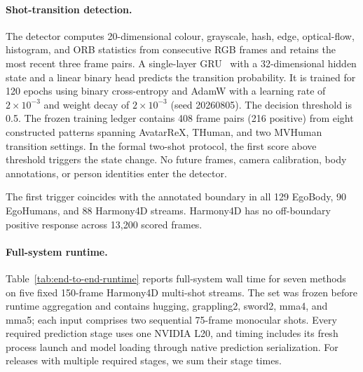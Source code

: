 \paragraph{Shot-transition detection.}
The detector computes 20-dimensional colour, grayscale, hash, edge, optical-flow,
histogram, and ORB statistics from consecutive RGB frames and retains the most
recent three frame pairs. A single-layer GRU~\citep{cho2014gru} with a
32-dimensional hidden state and a linear binary head predicts the transition
probability. It is trained for 120 epochs using binary cross-entropy and AdamW
with a learning rate of $2\!\times\!10^{-3}$ and weight decay of
$2\!\times\!10^{-3}$ (seed 20260805). The decision threshold is 0.5. The
frozen training ledger contains 408 frame pairs (216
positive) from eight constructed patterns spanning AvatarReX, THuman, and two
MVHuman transition settings. In the formal two-shot protocol, the first score
above threshold triggers the state change. No future frames, camera calibration,
body annotations, or person identities enter the detector.

The first trigger coincides with the annotated boundary in all 129 EgoBody,
90 EgoHumans, and 88 Harmony4D streams. Harmony4D has no off-boundary positive
response across 13,200 scored frames.

\paragraph{Full-system runtime.}
Table~\ref{tab:end-to-end-runtime} reports full-system wall time for seven
methods on five fixed 150-frame Harmony4D multi-shot streams. The set was frozen
before runtime aggregation and contains hugging, grappling2, sword2, mma4, and
mma5; each input comprises two sequential 75-frame monocular shots. Every
required prediction stage uses one NVIDIA L20, and timing includes its fresh
process launch and model loading through native prediction serialization. For
releases with multiple required stages, we sum their stage times.

